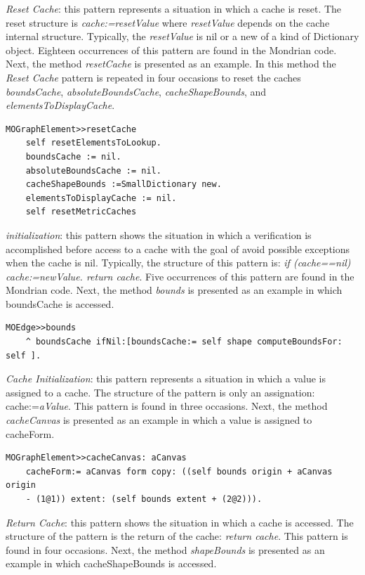 \documentclass[runningheads]{llncs}
\begin{document}
\emph{Reset Cache}: this pattern represents a situation in which a
cache is reset. The reset structure is \emph{cache:=resetValue} where
\emph{resetValue} depends on the cache internal structure. Typically,
the \emph{resetValue} is nil or a new of a kind of Dictionary object.
Eighteen occurrences of this pattern are found in the Mondrian code.
Next, the method \emph{resetCache} is presented as an example. In
this method the \emph{Reset Cache} pattern is repeated in four occasions
to reset the caches \emph{boundsCache}, \emph{absoluteBoundsCache},
\emph{cacheShapeBounds}, and \emph{elementsToDisplayCache}.

\begin{lstlisting} 
MOGraphElement>>resetCache 
	self resetElementsToLookup.
	boundsCache := nil. 
	absoluteBoundsCache := nil. 
	cacheShapeBounds :=SmallDictionary new. 
	elementsToDisplayCache := nil. 
	self resetMetricCaches
\end{lstlisting}

\emph{
 initialization}: this pattern shows
the situation in which a verification is accomplished before access
to a cache with the goal of avoid possible exceptions when the cache
is nil. Typically, the structure of this pattern is: \emph{if (cache==nil)
cache:=newValue. return cache}. Five occurrences of this pattern are
found in the Mondrian code. Next, the method \emph{bounds} is presented
as an example in which boundsCache is accessed.

\begin{lstlisting} 
MOEdge>>bounds  
	^ boundsCache ifNil:[boundsCache:= self shape computeBoundsFor: self ]. 
\end{lstlisting}

\emph{Cache Initialization}: this pattern represents a situation in
which a value is assigned to a cache. The structure of the pattern
is only an assignation: cache:=\emph{aValue}. This pattern is found
in three occasions. Next, the method \emph{cacheCanvas} is presented
as an example in which a value is assigned to cacheForm.

\begin{lstlisting} 
MOGraphElement>>cacheCanvas: aCanvas 
	cacheForm:= aCanvas form copy: ((self bounds origin + aCanvas origin 
	- (1@1)) extent: (self bounds extent + (2@2))). 
\end{lstlisting}

\emph{Return Cache}: this pattern shows the situation in which a cache
is accessed. The structure of the pattern is the return of the cache:
\emph{return cache}. This pattern is found in four occasions. Next,
the method \emph{shapeBounds} is presented as an example in which
cacheShapeBounds is accessed.
\end{document}
